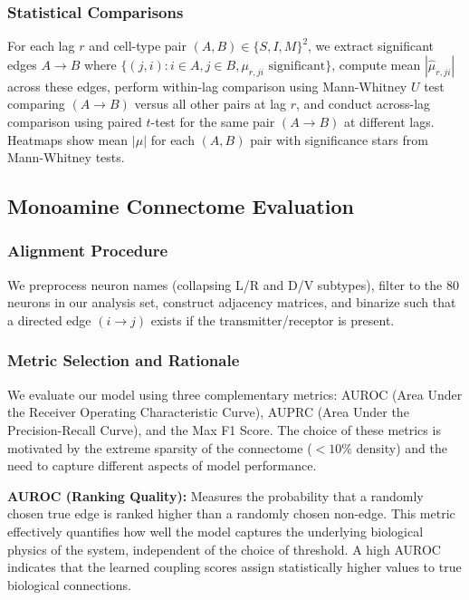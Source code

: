 \documentclass{article}
\theoremstyle{plain}
\theoremstyle{definition}
\theoremstyle{remark}
\newcommand{\1}{\mathbf{1}}
\begin{document}
\subsubsection{Statistical Comparisons}

For each lag $r$ and cell-type pair $(A, B) \in \{S, I, M\}^2$, we extract significant edges $A \to B$ where $\{(j,i) : i \in A, j \in B, \mu_{r,ji} \text{ significant}\}$, compute mean $|\widehat{\mu}_{r,ji}|$ across these edges, perform within-lag comparison using Mann-Whitney $U$ test comparing $(A \to B)$ versus all other pairs at lag $r$, and conduct across-lag comparison using paired $t$-test for the same pair $(A \to B)$ at different lags. Heatmaps show mean $|\mu|$ for each $(A, B)$ pair with significance stars from Mann-Whitney tests.

\subsection{Monoamine Connectome Evaluation}
\label{app:monoamine}

\subsubsection{Alignment Procedure}

We preprocess neuron names (collapsing L/R and D/V subtypes), filter to the 80 neurons in our analysis set, construct adjacency matrices, and binarize such that a directed edge $(i \to j)$ exists if the transmitter/receptor is present.

\subsubsection{Metric Selection and Rationale}
We evaluate our model using three complementary metrics: AUROC (Area Under the Receiver Operating Characteristic Curve), AUPRC (Area Under the Precision-Recall Curve), and the Max F1 Score. The choice of these metrics is motivated by the extreme sparsity of the connectome ($<10\%$ density) and the need to capture different aspects of model performance.

\textbf{AUROC (Ranking Quality):} Measures the probability that a randomly chosen true edge is ranked higher than a randomly chosen non-edge. This metric effectively quantifies how well the model captures the underlying biological physics of the system, independent of the choice of threshold. A high AUROC indicates that the learned coupling scores assign statistically higher values to true biological connections.
\end{document}
